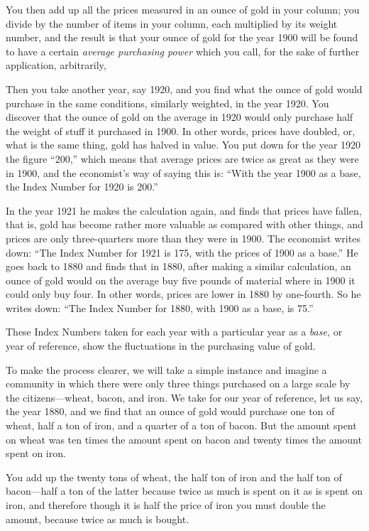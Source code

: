 \documentclass{book}
\begin{document}
You then add up all the prices measured in an ounce of gold in your column; you divide by the number of items in your column, each multiplied by its weight number, and the result is that your ounce of gold for the year 1900 will be found to have a certain \emph{average purchasing power} which you call, for the sake of further application, arbitrarily,

Then you take another year, say 1920, and you find what the ounce of gold would purchase in the same conditions, similarly weighted, in the year 1920. You discover that the ounce of gold on the average in 1920 would only purchase half the weight of stuff it purchased in 1900. In other words, prices have doubled, or, what is the same thing, gold has halved in value. You put down for the year 1920 the figure “200,” which means that average prices are twice as great as they were in 1900, and the economist’s way of saying this is: “With the year 1900 as a base, the Index Number for 1920 is 200.”

In the year 1921 he makes the calculation again, and finds that prices have fallen, that is, gold has become rather more valuable as compared with other things, and prices are only three-quarters more than they were in 1900. The economist writes down: “The Index Number for 1921 is 175, with the prices of 1900 as a base.” He goes back to 1880 and finds that in 1880, after making a similar calculation, an ounce of gold would on the average buy five pounds of material where in 1900 it could only buy four. In other words, prices are lower in 1880 by one-fourth. So he writes down: “The Index Number for 1880, with 1900 as a base, is 75.”

These Index Numbers taken for each year with a particular year as a \emph{base,} or year of reference, show the fluctuations in the purchasing value of gold.

To make the process clearer, we will take a simple instance and imagine a community in which there were only three things purchased on a large scale by the citizens—wheat, bacon, and iron. We take for our year of reference, let us say, the year 1880, and we find that an ounce of gold would purchase one ton of wheat, half a ton of iron, and a quarter of a ton of bacon. But the amount spent on wheat was ten times the amount spent on bacon and twenty times the amount spent on iron.

You add up the twenty tons of wheat, the half ton of iron and the half ton of bacon—half a ton of the latter because twice as much is spent on it as is spent on iron, and therefore though it is half the price of iron you must double the amount, because twice as much is bought.
\end{document}
